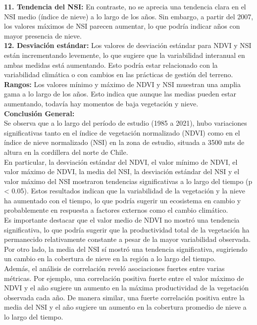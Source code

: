 {\textbf{11. Tendencia del NSI:} En contraste, no se aprecia una tendencia clara en el NSI medio (índice de nieve) a lo largo de los años. Sin embargo, a partir del 2007, los valores máximos de NSI parecen aumentar, lo que podría indicar años con mayor presencia de nieve.\\

\textbf{12. Desviación estándar:} Los valores de desviación estándar para NDVI y NSI están incrementando levemente, lo que sugiere que la variabilidad interanual en ambas medidas está aumentando. Esto podría estar relacionado con la variabilidad climática o con cambios en las prácticas de gestión del terreno.\\
\textbf{Rangos:} Los valores mínimo y máximo de NDVI y NSI muestran una amplia gama a lo largo de los años. Esto indica que aunque las medias pueden estar aumentando, todavía hay momentos de baja vegetación y nieve.\\



\textbf{Conclusión General:}\\

Se observa que a lo largo del período de estudio (1985 a 2021), hubo variaciones significativas tanto en el índice de vegetación normalizado (NDVI) como en el índice de nieve normalizado (NSI) en la zona de estudio, situada a 3500 mts de altura en la cordillera del norte de Chile.\\

En particular, la desviación estándar del NDVI, el valor mínimo de NDVI, el valor máximo de NDVI, la media del NSI, la desviación estándar del NSI y el valor máximo del NSI mostraron tendencias significativas a lo largo del tiempo (p < 0.05). Estos resultados indican que la variabilidad de la vegetación y la nieve ha aumentado con el tiempo, lo que podría sugerir un ecosistema en cambio y probablemente en respuesta a factores externos como el cambio climático.\\

Es importante destacar que el valor medio de NDVI no mostró una tendencia significativa, lo que podría sugerir que la productividad total de la vegetación ha permanecido relativamente constante a pesar de la mayor variabilidad observada. Por otro lado, la media del NSI sí mostró una tendencia significativa, sugiriendo un cambio en la cobertura de nieve en la región a lo largo del tiempo.\\

Además, el análisis de correlación reveló asociaciones fuertes entre varias métricas. Por ejemplo, una correlación positiva fuerte entre el valor máximo de NDVI y el año sugiere un aumento en la máxima productividad de la vegetación observada cada año. De manera similar, una fuerte correlación positiva entre la media del NSI y el año sugiere un aumento en la cobertura promedio de nieve a lo largo del tiempo.\\

    
}